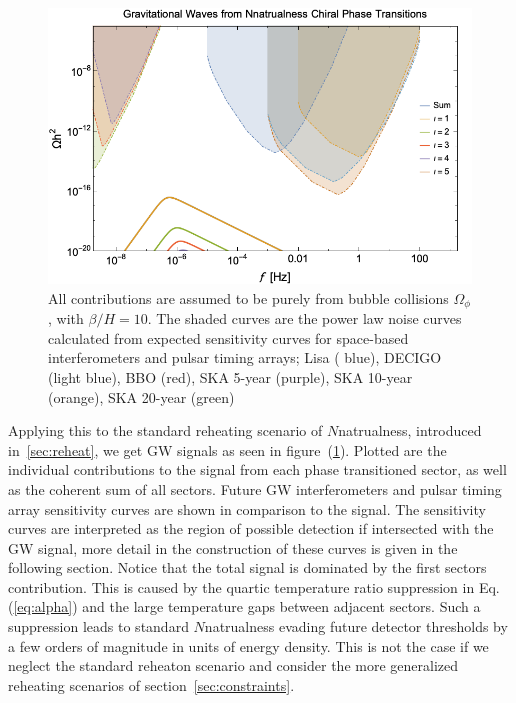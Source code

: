 \documentclass[nofootinbib,twocolumn,preprintnumbers]{revtex4-1}
\begin{document}
\begin{figure}[h!]
\centering
\includegraphics[scale=.3]{Nnatral.png} 
\caption{ All contributions are assumed to be purely from bubble collisions $\Omega_{\phi}$, with $\beta/H  = 10$.  The shaded curves are the power law noise curves~\cite{PhysRevD.88.124032} calculated from expected sensitivity curves for space-based interferometers and pulsar timing arrays; Lisa ( blue), DECIGO (light blue), BBO (red), SKA 5-year (purple), SKA 10-year (orange), SKA 20-year (green)   }
\label{fig::Nnatural}
\end{figure}
Applying this to the standard reheating scenario of $N$natrualness, introduced in~\ref{sec:reheat}, we get GW signals as seen in figure~(\ref{fig::Nnatural}). Plotted are the individual contributions to the signal from each phase transitioned sector, as well as the coherent sum of all sectors. Future GW interferometers and pulsar timing array sensitivity curves are shown in comparison to the signal. The sensitivity curves are interpreted as the region of possible detection if intersected with the GW signal, more detail in the construction of these curves is given in the following section. Notice that the total signal is dominated by the first sectors contribution. This is caused by the quartic temperature ratio suppression in Eq. (\ref{eq:alpha}) and the large temperature gaps between adjacent sectors. Such a suppression leads to standard $N$natrualness evading future detector thresholds by a few orders of magnitude in units of energy density. This is not the case if we neglect the standard reheaton scenario and consider the more generalized reheating scenarios of section~\ref{sec:constraints}. 
\end{document}
